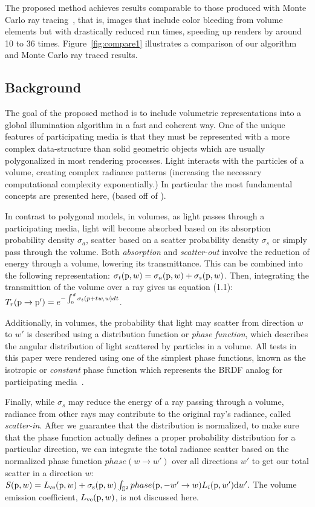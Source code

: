 \documentclass[runningheads]{llncs}
\begin{document}
  The proposed method achieves results comparable to those produced with Monte Carlo ray tracing~\cite{MCRay1}, that is, images that include color bleeding from volume elements but with drastically reduced run times, speeding up renders by around 10 to 36 times.  Figure~\ref{fig:compare1} illustrates a comparison of our algorithm and Monte Carlo ray traced results.


\subsection{Background}
\label{background_sec}
The goal of the proposed method is to include volumetric representations into a global illumination algorithm in a fast and coherent way. One of the unique features of participating media is that they must be represented with a more complex data-structure than solid geometric objects which are usually polygonalized in most rendering processes.  Light interacts with the particles of a volume, creating complex radiance patterns (increasing the necessary computational complexity exponentially.) In particular the most fundamental concepts are presented here,  (based off of  \cite{pbrt}).

In contrast to polygonal models, in volumes, as light passes through a participating media, light will become absorbed based on its absorption probability density $\sigma_{a}$, scatter based on a scatter probability density $\sigma_{s}$ or simply pass through the volume.  Both \emph{absorption} and \emph{scatter-out} involve the reduction of energy through a volume, lowering its transmittance.  This can be combined into the following representation: $\sigma_{t}(\textup{p},w) = \sigma_{a}(\textup{p},w) + \sigma_{s}(\textup{p}, w)$.
Then, integrating the transmittion of the volume over a ray gives us equation (1.1): $T_{r}(\textup{p} \to \textup{p}') = e^{-\int_{0}^{d}\sigma_{t} (p+t\mathit{w},\mathit{w})d\mathit{t}}\label{transmittion_eq}$.

Additionally, in volumes, the probability that light may scatter from direction $w$ to $w'$ is described using a distribution function or \textit{phase function}, which describes the angular distribution of light scattered by particles in a volume.  All tests in this paper were rendered using one of the simplest phase functions, known as the isotropic or \textit{constant} phase function which represents the BRDF analog for participating media~\cite{cerezo}.

Finally, while $\sigma_{s}$ may reduce the energy of a ray passing through a volume, radiance from other rays may contribute to the original ray's radiance, called \emph{scatter-in}.  After we guarantee that the distribution is normalized,  to make sure that the phase function actually defines a proper probability distribution for a particular direction, we can integrate the total radiance scatter based on the normalized phase function $phase(w \to w')$ over all directions $w'$ to get our total scatter in a direction $w$: $\mathit{S}(\textup{p},w) = \mathit{L}_{\textup{ve}}(\textup{p},w) + \sigma_{\textup{s}}(\textup{p}, w) \int_{\mathbb{S}^2} phase(\textup{p}, -w' \to w) L_{i}(\textup{p},w')\textup{d}w'.$  The volume emission coefficient, $L_{\textup{ve}}(\textup{p}, w)$, is not discussed here.
\end{document}
